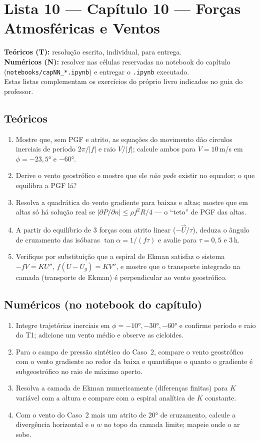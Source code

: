 \documentclass[11pt]{article}
\newcommand{\instrucoes}{%
\begin{caixalista}
\textbf{Teóricos (T):} resolução escrita, individual, para entrega.\\
\textbf{Numéricos (N):} resolver nas células reservadas no notebook do
capítulo (\texttt{notebooks/capNN\_*.ipynb}) e entregar o
\texttt{.ipynb} executado.\\
Estas listas complementam os exercícios do próprio livro indicados no
guia do professor.
\end{caixalista}}
\begin{document}
\clearpage
\section*{Lista 10 --- Capítulo 10 --- Forças Atmosféricas e Ventos}
\instrucoes

\subsection*{Teóricos}

\begin{enumerate}[label=\textbf{T\arabic*.},itemsep=4pt]
  \item Mostre que, sem PGF e atrito, as equações do movimento dão
        círculos inerciais de período $2\pi/|f|$ e raio $V/|f|$; calcule
        ambos para $V = 10$\,m/s em $\phi = -23{,}5°$ e $-60°$.
  \item Derive o vento geostrófico e mostre que ele \emph{não pode}
        existir no equador; o que equilibra a PGF lá?
  \item Resolva a quadrática do vento gradiente para baixas e altas;
        mostre que em altas só há solução real se
        $|\partial P/\partial n| \le \rho f^2 R/4$ — o ``teto'' de PGF
        das altas.
  \item A partir do equilíbrio de 3 forças com atrito linear
        ($-\vec U/\tau$), deduza o ângulo de cruzamento das isóbaras
        $\tan\alpha = 1/(f\tau)$ e avalie para $\tau = 0{,}5$ e 3\,h.
  \item Verifique por substituição que a espiral de Ekman satisfaz o
        sistema $-fV = K U''$, $f(U - U_g) = K V''$, e mostre que o
        transporte integrado na camada (transporte de Ekman) é
        perpendicular ao vento geostrófico.
\end{enumerate}

\subsection*{Numéricos (no notebook do capítulo)}

\begin{enumerate}[label=\textbf{N\arabic*.},itemsep=4pt]
  \item Integre trajetórias inerciais em $\phi = -10°, -30°, -60°$ e
        confirme período e raio do T1; adicione um vento médio e observe
        as cicloides.
  \item Para o campo de pressão sintético do Caso~2, compare o vento
        geostrófico com o vento gradiente ao redor da baixa e
        quantifique o quanto o gradiente é subgeostrófico no raio de
        máximo aperto.
  \item Resolva a camada de Ekman numericamente (diferenças finitas)
        para $K$ variável com a altura e compare com a espiral analítica
        de $K$ constante.
  \item Com o vento do Caso~2 mais um atrito de 20° de cruzamento,
        calcule a divergência horizontal e o $w$ no topo da camada
        limite; mapeie onde o ar sobe.
\end{enumerate}
\end{document}

